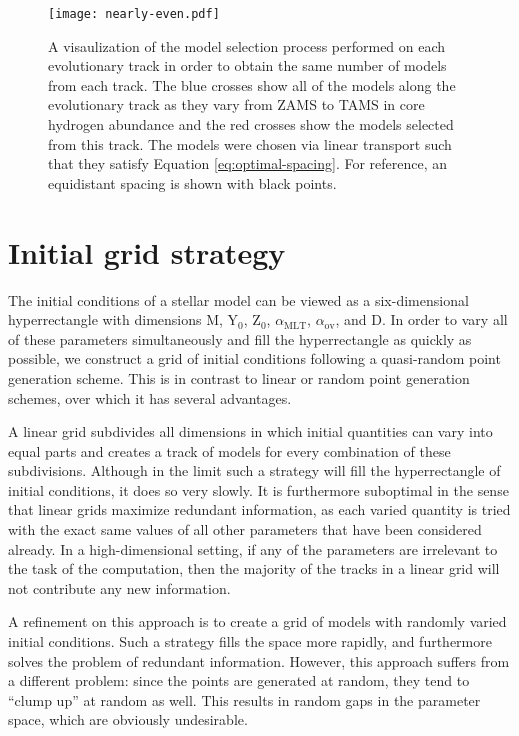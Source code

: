 \documentclass[manuscript,linenumbers]{aastex6}
\newif\ifref
\newcommand{\mb}[1]{\ifref\boldmath\textbf{#1}\unboldmath\else #1\fi}
\begin{document}
\begin{figure*}
    \centering
    \texttt{[image: nearly-even.pdf]}
    \caption{ A visaulization of the model selection process performed on each evolutionary track in order to obtain the same number of models from each track. The blue crosses show all of the models along the evolutionary track as they vary from ZAMS to TAMS in core hydrogen abundance and the red crosses show the models selected from this track. The models were chosen via linear transport such that they satisfy Equation \ref{eq:optimal-spacing}. For reference, an equidistant spacing is shown with black points. \vspace*{5mm}
    \label{fig:nearly-even} }%
\end{figure*}


\section{Initial grid strategy}
\label{sec:grid}
The initial conditions of a stellar model can be viewed as a \mb{six-dimensional hyperrectangle} with dimensions M, Y$_0$, Z$_0$, $\alpha_{\text{MLT}}$, $\alpha_{\text{ov}}$, and D. In order to vary all of these parameters simultaneously and fill the \mb{hyperrectangle} as quickly as possible, we construct a grid of initial conditions following a quasi-random point generation scheme. This is in contrast to linear or random point generation schemes, over which it has several advantages. 

A linear grid subdivides all dimensions in which initial quantities can vary into equal parts and creates a track of models for every combination of these subdivisions. Although in the limit such a strategy will fill the \mb{hyperrectangle} of initial conditions, it does so very slowly. It is furthermore suboptimal in the sense that linear grids maximize redundant information, as each varied quantity is tried with the exact same values of all other parameters that have been considered already. In a high-dimensional setting, if any of the parameters are irrelevant to the task of the computation, then the majority of the tracks in a linear grid will not contribute any new information.

A refinement on this approach is to create a grid of models with randomly varied initial conditions. Such a strategy fills the space more rapidly, and furthermore solves the problem of redundant information. However, this approach suffers from a different problem: since the points are generated at random, they tend to ``clump up'' at random as well. This results in random gaps in the parameter space, which are obviously undesirable. 
\end{document}
